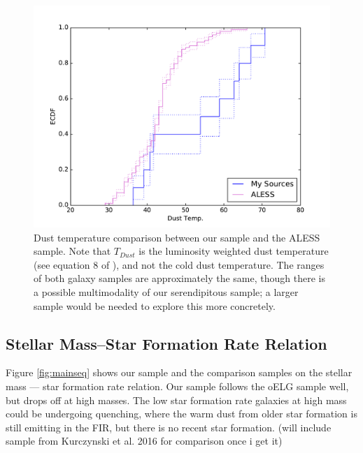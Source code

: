 \documentclass[preprint,natbib209]{aastex}
\begin{document}
\begin{figure}[t]
\centering
\includegraphics[scale=0.8]{ecdf_tdust.pdf}
\caption{Dust temperature comparison between our sample and the ALESS sample. Note that $T_{Dust}$ is the luminosity weighted dust temperature (see equation 8 of \cite{dacunha15}), and not the cold dust temperature. The ranges of both galaxy samples are approximately the same, though there is a possible multimodality of our serendipitous sample; a larger sample would be needed to explore this more concretely.}
\label{fig:tdust}
\end{figure}

\subsection{Stellar Mass--Star Formation Rate Relation}

Figure \ref{fig:mainseq} shows our sample and the comparison samples on the stellar mass --- star formation rate relation. Our sample follows the oELG sample well, but drops off at high masses. The low star formation rate galaxies at high mass could be undergoing quenching, where the warm dust from older star formation is still emitting in the FIR, but there is no recent star formation. (will include sample from Kurczynski et al. 2016 for comparison once i get it)
\end{document}
